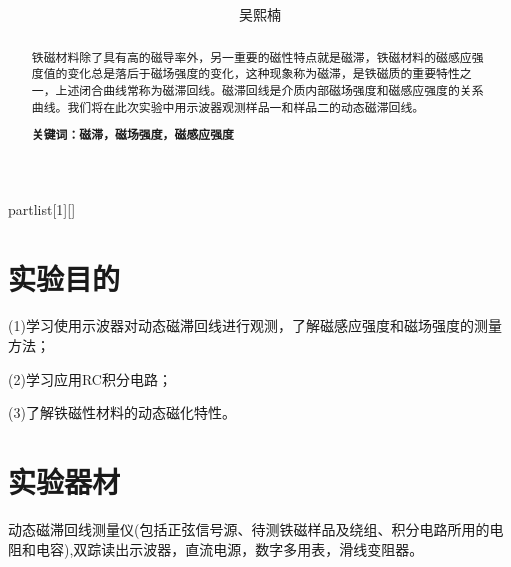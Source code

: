 \documentclass[UTF8]{ctexart}
\author{
	吴熙楠}
\title{
	\heiti{观测动态磁滞回线}
}
\begin{document}
	\maketitle
	\newtheorem{definition}{定义}[subsection]
	\newtheorem{function}{公式}[subsection]
	\newtheorem{summary}{小结}[subsection]
	\newtheorem{deduction}{推论}[subsection]
	\newtheorem{property}{性质}[subsection]
	\newtheorem{theo}{定理}[subsection]
	\newtheorem{step}{步骤}[subsection]
	\newtheorem{remark}{注记}[subsection]
	\newtheorem{proof}{证明}[subsection]
	\newenvironment{Theorem}[1][]{\par\noindent\textbf{定理}(#1)\quad}{\par}
	\newcommand{\rbra}[1]{\left( #1 \right)}
	\newcommand{\sbra}[1]{\left[ #1 \right]}
	\newcommand{\cbra}[1]{\left\{ #1 \right\}}
	\newcommand{\pbra}[1]{\left< #1 \right>}
	\newcommand{\abs}[1]{\left| #1 \right|}
	\newcommand{\fs}[2]{\displaystyle\frac{#1}{#2}}
	
	\newenvironment{myproof}{{\color{blue}证：}}
	
	\newenvironment{partlist}[1][]
	{\begin{enumerate}[itemsep=0pt, label=(\arabic*), wide, labelindent=\parindent, listparindent=\parindent, #1]}
		{\end{enumerate}}
	\renewcommand{\abstractname}{\Large 摘要\\}
	\begin{abstract}
		{\normalsize 铁磁材料除了具有高的磁导率外，另一重要的磁性特点就是磁滞，铁磁材料的磁感应强度值的变化总是落后于磁场强度的变化，这种现象称为磁滞，是铁磁质的重要特性之一，上述闭合曲线常称为磁滞回线。磁滞回线是介质内部磁场强度和磁感应强度的关系曲线。我们将在此次实验中用示波器观测样品一和样品二的动态磁滞回线。
			
			\textbf{关键词：磁滞，磁场强度，磁感应强度}}
	\end{abstract}
	
	\newpage
	\renewcommand{\contentsname}{目录} %
	\tableofcontents
	\newpage
	\section{实验目的}
	(1)学习使用示波器对动态磁滞回线进行观测，了解磁感应强度和磁场强度的测量方法；
	\par (2)学习应用RC积分电路；
	\par (3)了解铁磁性材料的动态磁化特性。
	\section{实验器材}
	动态磁滞回线测量仪(包括正弦信号源、待测铁磁样品及绕组、积分电路所用的电阻和电容),双踪读出示波器，直流电源，数字多用表，滑线变阻器。
\end{document}
